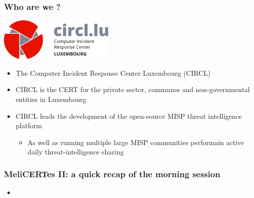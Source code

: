 
\begin{frame}[t,plain]
\titlepage
\end{frame}


\begin{frame}
\frametitle{Who are we ?}
    \begin{center}
        \includegraphics[width=0.4\linewidth]{pictures/circl.png}
    \end{center}
    \begin{itemize}
        \item The Computer Incident Response Center Luxembourg (CIRCL)
        \item CIRCL is the CERT for the private sector, communes and non-governmental entities in Luxembourg
        \item CIRCL leads the development of the open-source MISP threat intelligence platform
        \begin{itemize}
            \item As well as running multiple large MISP communities performain active daily threat-intelligence sharing
        \end{itemize}
    \end{itemize}
\end{frame}

\begin{frame}
\frametitle{MeliCERTes II: a quick recap of the morning session}
    \begin{itemize}
        \item {}
    \end{itemize}
\end{frame}

